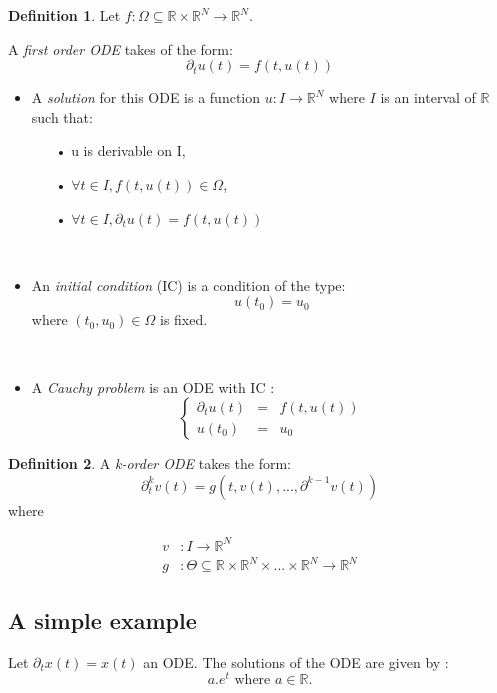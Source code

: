 \documentclass[10pt,a4paper]{article}
\theoremstyle{definition}
\newtheorem{definition}{Definition}
\theoremstyle{definition}
\theoremstyle{definition}
\begin{document}
\begin{definition}
Let $f: \Omega \subseteq \mathbb{R} \times \mathbb{R}^N \rightarrow \mathbb{R}^N$. 

A \textit{first order ODE} takes of the form:
$$
\partial_t u(t) = f(t,u(t))
$$

\begin{itemize}
\item A \textit{solution} for this ODE is a function $u : I \rightarrow \mathbb{R}^N$ where $I$ is an interval of $\mathbb{R}$ such that:
	\begin{itemize}
	\item[•] u is derivable on I,
	\item[•] $\forall t \in I, f(t, u(t)) \in \Omega$,
	\item[•] $\forall t \in I, \partial_t u(t) = f(t, u(t))$
	\end{itemize}
~

\item An \textit{initial condition} (IC) is a condition of the type:
$$
u(t_0) = u_0
$$
where $(t_0, u_0) \in \Omega$ is fixed.

~

\item A \textit{Cauchy problem} is an ODE with IC :
$$
\left \{
\begin{array}{rcl}
\partial_t u(t) & = & f(t, u(t)) \\
u(t_0) & = & u_0
\end{array}
\right.
$$
\end{itemize}
\end{definition}

\begin{definition}
A \textit{k-order ODE} takes the form:
$$
\partial^k_t v(t) = g(t, v(t), ... , \partial^{k-1}v(t))
$$
where 

\begin{align*}
v &:  I \rightarrow \mathbb{R}^N \\ 
g &:  \Theta \subseteq \mathbb{R} \times \mathbb{R}^N \times ... \times \mathbb{R}^N \rightarrow \mathbb{R}^N
\end{align*} 
\end{definition}

\subsection{A simple example}
Let $\partial_t x(t) = x(t)$ an ODE. The solutions of the ODE are given by : 
$$
a . e^t \text{ where } a\in \mathbb{R}.
$$
\end{document}
